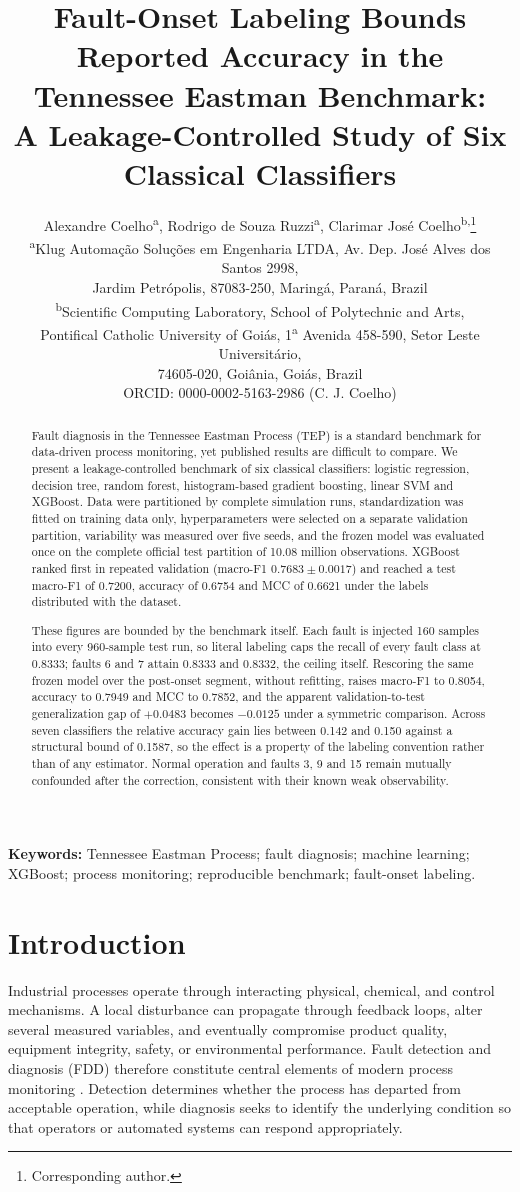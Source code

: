\documentclass[10pt,twocolumn,a4paper]{article}
\title{\Large\textbf{Fault-Onset Labeling Bounds Reported Accuracy in the
Tennessee Eastman Benchmark:\\A Leakage-Controlled Study of Six Classical
Classifiers}}
\author{
Alexandre Coelho\textsuperscript{a},\;
Rodrigo de Souza Ruzzi\textsuperscript{a},\;
Clarimar Jos\'e Coelho\textsuperscript{b,}\thanks{Corresponding author.}\\[4pt]
\small \textsuperscript{a}Klug Automa\c{c}\~ao Solu\c{c}\~oes em Engenharia LTDA,
Av. Dep. Jos\'e Alves dos Santos 2998,\\
\small Jardim Petr\'opolis, 87083-250, Maring\'a, Paran\'a, Brazil\\[2pt]
\small \textsuperscript{b}Scientific Computing Laboratory, School of Polytechnic
and Arts,\\
\small Pontifical Catholic University of Goi\'as, 1\textsuperscript{a} Avenida
458-590, Setor Leste Universit\'ario,\\
\small 74605-020, Goi\^ania, Goi\'as, Brazil\\[2pt]
\small ORCID: 0000-0002-5163-2986 (C. J. Coelho)}
\date{}
\begin{document}
\maketitle

\begin{abstract}
Fault diagnosis in the Tennessee Eastman Process (TEP) is a standard benchmark
for data-driven process monitoring, yet published results are difficult to
compare. We present a leakage-controlled benchmark of six classical
classifiers: logistic regression, decision tree, random forest,
histogram-based gradient boosting, linear  SVM and XGBoost.
Data were partitioned by complete simulation runs, standardization was fitted
on training data only, hyperparameters were selected on a separate validation
partition, variability was measured over five seeds, and the frozen model was
evaluated once on the complete official test partition of 10.08 million
observations. XGBoost ranked first in repeated validation (macro-F1
$0.7683\pm0.0017$) and reached a test macro-F1 of 0.7200, accuracy of 0.6754
and MCC of 0.6621 under the labels distributed with the dataset.

These figures are bounded by the benchmark itself. Each fault is injected 160
samples into every 960-sample test run, so literal labeling caps the recall of
every fault class at 0.8333; faults 6 and 7 attain 0.8333 and 0.8332, the
ceiling itself. Rescoring the same frozen model over the post-onset segment,
without refitting, raises macro-F1 to 0.8054, accuracy to 0.7949 and MCC to
0.7852, and the apparent validation-to-test generalization gap of $+0.0483$
becomes $-0.0125$ under a symmetric comparison. Across seven classifiers the
relative accuracy gain lies between 0.142 and 0.150 against a structural bound
of 0.1587, so the effect is a property of the labeling convention rather than
of any estimator. Normal operation and faults 3, 9 and 15 remain mutually
confounded after the correction, consistent with their known weak
observability.
\end{abstract}

\noindent\textbf{Keywords:} Tennessee Eastman Process; fault diagnosis;
machine learning; XGBoost; process monitoring; reproducible benchmark;
fault-onset labeling.

\section{Introduction}

Industrial processes operate through interacting physical, chemical, and
control mechanisms. A local disturbance can propagate through feedback loops,
alter several measured variables, and eventually compromise product quality,
equipment integrity, safety, or environmental performance. Fault detection and
diagnosis (FDD) therefore constitute central elements of modern process
monitoring \cite{venkatasubramanian2003review,yin2014review,ji2022review}.
Detection determines whether the process has departed from acceptable
operation, while diagnosis seeks to identify the underlying condition so that
operators or automated systems can respond appropriately.
\end{document}
